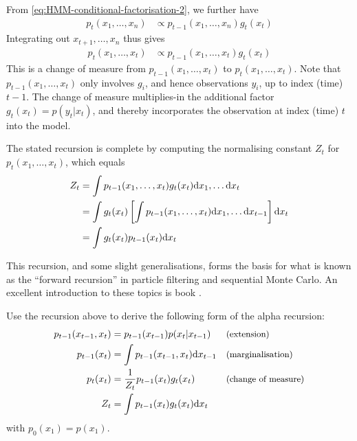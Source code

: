 \begin{exenumerate}
\begin{solution}
    From \eqref{eq:HMM-conditional-factorisation-2}, we further have
    \begin{align}
      p_t(x_1, \ldots, x_n) & \propto  p_{t-1}(x_1, \ldots, x_n) g_t(x_t)
    \end{align}
    Integrating out $x_{t+1}, \ldots, x_n$ thus gives
    \begin{align}
      p_t(x_1, \ldots, x_t) & \propto  p_{t-1}(x_1, \ldots, x_t) g_t(x_t)
    \end{align}
    This is a change of measure from $p_{t-1}(x_1, \ldots, x_t)$ to
    $p_t(x_1, \ldots, x_t)$. Note that $p_{t-1}(x_1, \ldots, x_t)$ only
    involves $g_i$, and hence observations $y_i$, up to index (time) $t-1$. The
    change of measure multiplies-in the additional factor
    $g_t(x_t)=p(y_t|x_t)$, and thereby incorporates the observation at index (time) $t$
    into the model.
  
    The stated recursion is complete by computing the normalising constant $Z_t$ for
    $p_t(x_1, \ldots, x_t)$, which equals
    \begin{align}
      Z_t & = \int  p_{t-1}(x_1, \ldots, x_t) g_t(x_t) \mathrm{d} x_1, \ldots \mathrm{d} x_t\\
      & = \int g_t(x_t) \left[\int p_{t-1}(x_1, \ldots, x_t) \mathrm{d} x_1, \ldots \mathrm{d} x_{t-1} \right] \mathrm{d} x_t\\
      & = \int g_t(x_t) p_{t-1}(x_t) \mathrm{d} x_t
    \end{align}
    
    This recursion, and some slight generalisations, forms the basis
    for what is known as the ``forward recursion'' in particle
    filtering and sequential Monte Carlo. An excellent introduction to
    these topics is book \citep{Chopin2020}.
  
\end{solution}

\item Use the recursion above to derive the following form of the alpha recursion: 
  \begin{align}
    p_{t-1}(x_{t-1}, x_t) &= p_{t-1}(x_{t-1}) p(x_t|x_{t-1}) && \text{\small (extension)} \\
    p_{t-1}(x_t) & = \int  p_{t-1}(x_{t-1}, x_t) \ud x_{t-1} &&\text{\small (marginalisation)}\\
    p_{t}(x_t) &= \frac{1}{Z_t} p_{t-1}(x_t) g_t(x_t)  &&\text{\small (change of measure)}\\
    Z_t & = \int p_{t-1}(x_t) g_t(x_t) \ud x_t
  \end{align}
  with $p_0(x_1) = p(x_1)$.
  

\end{exenumerate}
